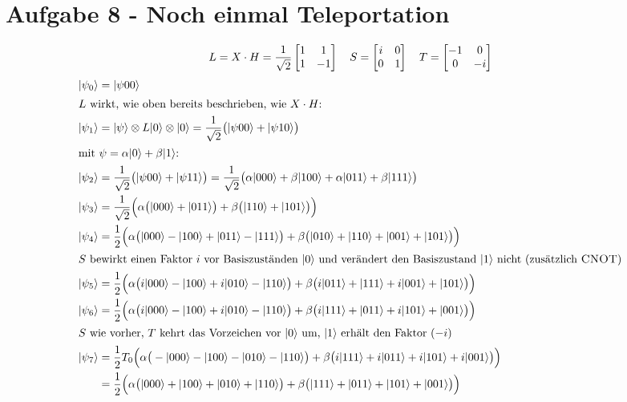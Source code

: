 \section*{Aufgabe 8 - Noch einmal Teleportation}
\[ L = X \cdot H = \frac{1}{\sqrt{2}} \begin{bmatrix}1&1\\1&-1\end{bmatrix} \quad S = \begin{bmatrix}i&0\\0&1\end{bmatrix} \quad T = \begin{bmatrix}-1&0\\0&-i\end{bmatrix} \]
\begin{align*}
        \vket{\psi_0} &= \vket{\psi 00} \\
        \intertext{$L$ wirkt, wie oben bereits beschrieben, wie $X \cdot H$:}
        \vket{\psi_1} &= \vket{\psi} \tensor L \vket{0} \tensor \vket{0} = \frac{1}{\sqrt{2}} \big(\vket{\psi 00}+\vket{\psi 10}\big) \\
        \intertext{mit $\psi = \alpha \vket{0} + \beta \vket{1}$:}
        \vket{\psi_2} &= \frac{1}{\sqrt{2}} \big(\vket{\psi 00} + \vket{\psi 11}\big) = \frac{1}{\sqrt{2}} \big(\alpha\vket{000} + \beta\vket{100} + \alpha\vket{011} + \beta\vket{111}\big) \\
        \vket{\psi_3} &= \frac{1}{\sqrt{2}} \Big(\alpha\big(\vket{000} + \vket{011}\big) + \beta\big(\vket{110} + \vket{101}\big)\Big) \\
        \vket{\psi_4} &= \frac{1}{2} \Big(\alpha\big(\vket{000} - \vket{100} + \vket{011} - \vket{111}\big) + \beta\big(\vket{010} + \vket{110} + \vket{001} + \vket{101}\big)\Big) \\
        \intertext{$S$ bewirkt einen Faktor $i$ vor Basiszuständen $\vket{0}$ und verändert den Basiszustand $\vket{1}$ nicht (zusätzlich \textsc{CNOT})}
        \vket{\psi_5} &= \frac{1}{2} \Big(\alpha\big(i\vket{000} - \vket{100} + i\vket{010} - \vket{110}\big) + \beta\big(i\vket{011} + \vket{111} + i\vket{001} + \vket{101}\big)\Big) \\
        \vket{\psi_6} &= \frac{1}{2} \Big(\alpha\big(i\vket{000} - \vket{100} + i\vket{010} - \vket{110}\big) + \beta\big(i\vket{111} + \vket{011} + i\vket{101} + \vket{001}\big)\Big) \\
        \intertext{$S$ wie vorher, $T$ kehrt das Vorzeichen vor $\vket{0}$ um, $\vket{1}$ erhält den Faktor $(-i)$}
        \vket{\psi_7} &= \frac{1}{2} T_0 \Big(\alpha\big(-\vket{000} - \vket{100} - \vket{010} - \vket{110}\big) + \beta\big(i\vket{111} + i\vket{011} + i\vket{101} + i\vket{001}\big)\Big) \\
                      &= \frac{1}{2} \Big(\alpha\big(\vket{000} + \vket{100} + \vket{010} + \vket{110}\big) + \beta\big(\vket{111} + \vket{011} + \vket{101} + \vket{001}\big)\Big) \\

\end{align*}
